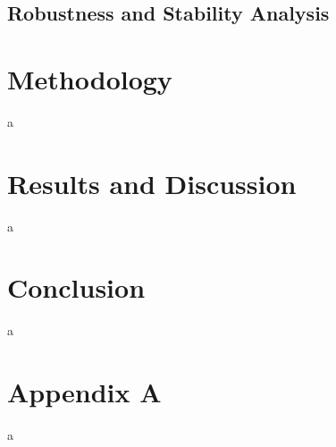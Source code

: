 \documentclass[a4paper,11pt]{book}
\numberwithin{figure}{chapter}
\numberwithin{equation}{chapter}
\numberwithin{table}{chapter}
\theoremstyle{definition}
\begin{document}
\section{Robustness and Stability Analysis}


\clearpage
\chapter{Methodology}

a

\clearpage
\chapter{Results and Discussion}

a

\clearpage
\chapter{Conclusion}

a

\clearpage
{}




\clearpage
{}
\chapter*{Appendix A}

a
	
\end{document}
